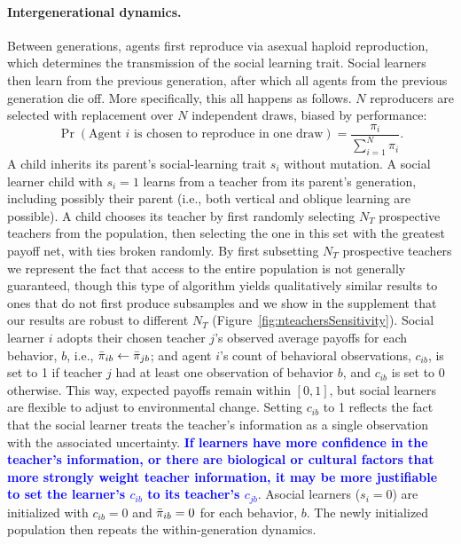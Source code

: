 \documentclass[letterpaper,11.5pt]{scrartcl}
\newcommand{\edit}[1]{{\bfseries \textcolor{blue} {#1}}}
\begin{document}
\paragraph{Intergenerational dynamics.} Between generations, agents first reproduce
via asexual haploid reproduction, which determines the transmission of the social
learning trait. Social learners then learn from the previous generation, after which
all agents from the previous generation die off. %
More
specifically, this all happens as follows.  $N$ reproducers are selected with
replacement over $N$ independent draws, biased by performance: 
\begin{equation}
  \Pr(\text{Agent $i$ is chosen to reproduce in one draw}) =
\frac{\pi_i}{\sum_{i=1}^N \pi_i}.  
\end{equation} 
\noindent 
A child inherits its parent's social-learning trait $s_i$ without mutation.  A social learner child with $s_i = 1$ learns from a teacher from its parent's generation, including possibly their parent (i.e., both vertical and oblique learning are possible).  A child chooses its teacher by first randomly selecting $N_T$ prospective teachers from the population, then selecting the one in this set with the greatest payoff net, with ties broken randomly. By first subsetting $N_T$ prospective teachers we represent the fact that access to the entire population is not generally guaranteed, though this type of algorithm yields qualitatively similar results to ones that do not first produce subsamples \citep{smaldino2019open} and we show in the supplement that our results are robust to different $N_T$
(Figure~\ref{fig:nteachersSensitivity}). Social learner $i$ adopts their chosen 
teacher $j$'s observed average payoffs for each behavior, $b$, i.e., 
$\bar\pi_{ib} \leftarrow \bar\pi_{jb}$; 
and agent $i$'s count of behavioral observations, $c_{ib}$, is set to 1 if teacher $j$ had at least
one observation of behavior $b$, and $c_{ib}$ is set to 0 otherwise. This way, expected payoffs
remain within $[0, 1]$, but social learners are flexible to adjust to environmental change. Setting
$c_{ib}$ to 1 reflects the fact that the social learner treats the teacher's information as a single
observation with the associated uncertainty. \edit{If learners have more confidence
in the teacher's information, or there are biological or cultural factors that more
strongly weight teacher information, it may be more justifiable to set the learner's $c_{ib}$ to its teacher's $c_{jb}$}. Asocial learners ($s_i = 0$) are initialized with
$c_{ib} = 0$ and $\bar\pi_{ib} = 0$ for each behavior, $b$. %
The newly initialized population then repeats the within-generation dynamics. 
\end{document}
